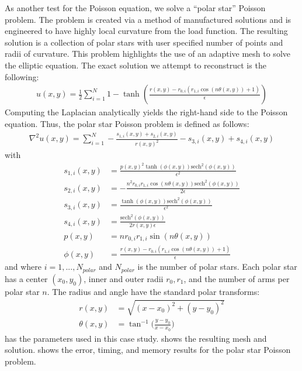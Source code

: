 As another test for the Poisson equation, we solve a ``polar star'' Poisson problem. The problem is created via a method of manufactured solutions and is engineered to have highly local curvature from the load function. The resulting solution is a collection of polar stars with user specified number of points and radii of curvature. This problem highlights the use of an adaptive mesh to solve the elliptic equation. The exact solution we attempt to reconstruct is the following:
\begin{align}
    u(x,y) = \frac{1}{2} \sum_{i=1}^{N} 1 - \tanh \left(\frac{r(x,y)-r_{0,i} \left(r_{1,i} \cos \left(n \theta(x,y)\right)+1\right)}{\epsilon }\right)
\end{align}
Computing the Laplacian analytically yields the right-hand side to the Poisson equation. Thus, the polar star Poisson problem is defined as follows:
\begin{align}
    \nabla^2 u(x,y) = \sum_{i=1}^N -\frac{s_{1,i}(x,y) + s_{2,i}(x, y)}{r(x,y)^2} - s_{3,i}(x,y) + s_{4,i}(x,y)
\end{align}
with
\begin{align*}
    s_{1,i}(x,y) &= \frac{p(x,y)^2 \tanh \left(\phi(x,y)\right) \text{sech}^2\left(\phi(x,y)\right)}{\epsilon ^2} \\
    s_{2,i}(x,y) &= -\frac{n^2 r_{0,i} r_{1,i} \cos (n \theta(x,y)) \text{sech}^2\left(\phi(x,y)\right)}{2 \epsilon } \\
    s_{3,i}(x,y) &= \frac{\tanh \left(\phi(x,y)\right) \text{sech}^2\left(\phi(x,y)\right)}{\epsilon ^2} \\
    s_{4,i}(x,y) &= \frac{\text{sech}^2\left(\phi(x,y)\right)}{2 r(x,y) \epsilon } \\
    p(x,y) &= n r_{0,i} r_{1,i} \sin (n \theta(x,y)) \\
    \phi(x,y) &= \frac{r(x,y)-r_{0,i} (r_{1,i} \cos (n \theta(x,y))+1)}{\epsilon}
\end{align*}
and where $i=1, ..., N_{polar}$ and $N_{polar}$ is the number of polar stars. Each polar star has a center $(x_0, y_0)$, inner and outer radii $r_0, r_1$, and the number of arms per polar star $n$. The radius and angle have the standard polar transforms:
\begin{align}
    r(x,y) &= \sqrt{(x - x_0)^2 + (y - y_0)^2} \\
    \theta(x,y) &= \tan^{-1}\Big(\frac{y - y_0}{x - x_0}\Big)
\end{align}
 has the parameters used in this case study.  shows the resulting mesh and solution.  shows the error, timing, and memory results for the polar star Poisson problem.
